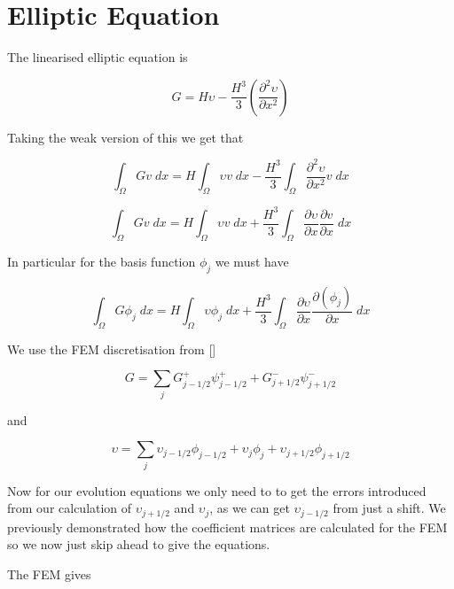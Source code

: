 \documentclass[12pt]{article}
\begin{document}
\section{Elliptic Equation}
The linearised elliptic equation is

\[G = H\upsilon -\frac{H^3}{3} \left(\frac{\partial^2 \upsilon}{\partial x^2}\right)\]

Taking the weak version of this we get that

\[\int_{\Omega}G  v \; dx = H \int_{\Omega} \upsilon v \; dx -\frac{H^3}{3}  \int_{\Omega} \frac{\partial^2 \upsilon}{\partial x^2} v \; dx\]

\[\int_{\Omega}G  v \; dx = H \int_{\Omega} \upsilon v \; dx  + \frac{H^3}{3}  \int_{\Omega} \frac{\partial \upsilon}{\partial x} \frac{\partial v}{\partial x} \; dx\]

In particular for the basis function $\phi_j$ we must have

\[\int_{\Omega}G  \phi_j \; dx = H \int_{\Omega} \upsilon \phi_j \; dx  + \frac{H^3}{3}  \int_{\Omega} \frac{\partial \upsilon}{\partial x} \frac{\partial \left(\phi_j\right)}{\partial x} \; dx\]

We use the FEM discretisation from []

\begin{equation*}
G = \sum_j G^+_{j-1/2}\psi^+_{j-1/2}  + G^-_{j+1/2}\psi^-_{j+1/2}
\end{equation*}

and

\begin{equation}
\upsilon = \sum_j \upsilon_{j-1/2}\phi_{j-1/2} + \upsilon_{j}\phi_{j}  + \upsilon_{j+1/2}\phi_{j+1/2}
\end{equation}

Now for our evolution equations we only need to to get the errors introduced from our calculation of $\upsilon_{j+1/2}$ and $\upsilon_{j}$, as we can get $\upsilon_{j-1/2}$ from just a shift. We previously demonstrated how the coefficient matrices are calculated for the FEM so we now just skip ahead to give the equations. 

The FEM gives
\end{document}
